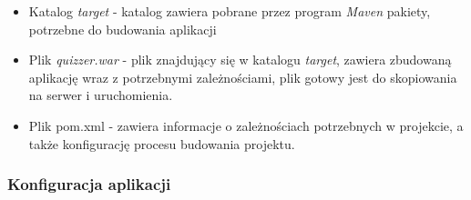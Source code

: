 \documentclass[a4paper, titlepage]{article}
\begin{document}
\begin{itemize}
\item Katalog \textit{target} - katalog zawiera pobrane przez program \textit{Maven} pakiety, potrzebne do budowania aplikacji
\item Plik \textit{quizzer.war} - plik znajdujący się w katalogu \textit{target}, zawiera zbudowaną aplikację wraz z potrzebnymi zależnościami, plik gotowy jest do skopiowania na serwer i uruchomienia.
\item Plik pom.xml - zawiera informacje o zależnościach potrzebnych w projekcie, a także konfigurację procesu budowania projektu.
\end{itemize}

\subsubsection{Konfiguracja aplikacji}
\label{sec:KONFIGURACJA}
\end{document}
